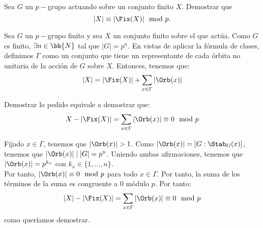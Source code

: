 \begin{ejercicio}\label{ej:6.12}
    Sea $G$ un $p-$grupo actuando sobre un conjunto finito $X$. Demostrar que
    \[
        |X| \equiv |\Fix(X)| \mod p.
    \]

    Sea $G$ un $p-$grupo finito y sea $X$ un conjunto finito sobre el que actúa. Como $G$ es finito, $\exists n\in \bb{N}$ tal que $|G|=p^n$.
    En vistas de aplicar la fórmula de clases, definimos $\Gamma$ como un conjunto que tiene un representante de cada órbita no unitaria de la acción de $G$ sobre $X$. Entonces, tenemos que:
    \begin{equation*}
        |X| = |\Fix(X)| + \sum_{x\in \Gamma} |\Orb(x)|
    \end{equation*}

    Demostrar lo pedido equivale a demostrar que:
    \begin{equation*}
        X-|\Fix(X)| = \sum_{x\in \Gamma} |\Orb(x)| \equiv 0 \mod p
    \end{equation*}

    Fijado $x\in \Gamma$, tenemos que $|\Orb(x)|>1$. Como $|\Orb(x)|=[G:\Stab_G(x)]$, tenemos que $|\Orb(x)|\mid |G|=p^n$. Uniendo ambas afirmaciones, tenemos que $|\Orb(x)|=p^{k_x}$ con $k_x\in \{1,\ldots,n\}$.\\

    Por tanto, $|\Orb(x)|\equiv 0 \mod p$ para todo $x\in \Gamma$. Por tanto, la suma de los términos de la suma es congruente a $0$ módulo $p$. Por tanto:
    \begin{equation*}
        |X| - |\Fix(X)| = \sum_{x\in \Gamma} |\Orb(x)| \equiv 0 \mod p
    \end{equation*}
    como queríamos demostrar.

\end{ejercicio}

